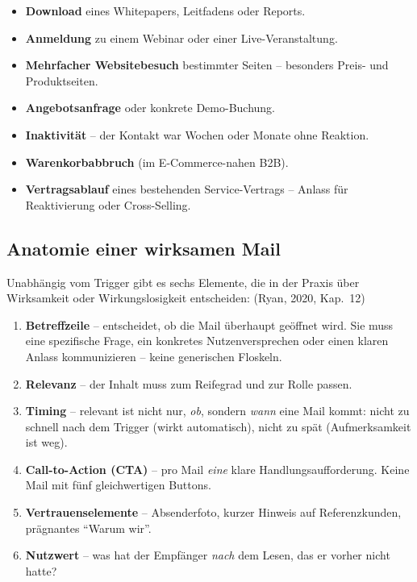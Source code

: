 \documentclass[11pt,a4paper,oneside]{article}
\newcommand{\quelle}[1]{{\footnotesize\color{lpGray}(#1)}}
\begin{document}
\begin{itemize}
  \item \textbf{Download} eines Whitepapers, Leitfadens oder Reports.
  \item \textbf{Anmeldung} zu einem Webinar oder einer Live-Veranstaltung.
  \item \textbf{Mehrfacher Websitebesuch} bestimmter Seiten -- besonders Preis- und Produktseiten.
  \item \textbf{Angebotsanfrage} oder konkrete Demo-Buchung.
  \item \textbf{Inaktivität} -- der Kontakt war Wochen oder Monate ohne Reaktion.
  \item \textbf{Warenkorbabbruch} (im E-Commerce-nahen B2B).
  \item \textbf{Vertragsablauf} eines bestehenden Service-Vertrags -- Anlass für Reaktivierung oder Cross-Selling.
\end{itemize}

\subsection{Anatomie einer wirksamen Mail}

Unabhängig vom Trigger gibt es sechs Elemente, die in der Praxis über Wirksamkeit oder Wirkungslosigkeit entscheiden: \quelle{Ryan, 2020, Kap.~12}

\begin{enumerate}
  \item \textbf{Betreffzeile} -- entscheidet, ob die Mail überhaupt geöffnet wird. Sie muss eine spezifische Frage, ein konkretes Nutzenversprechen oder einen klaren Anlass kommunizieren -- keine generischen Floskeln.
  \item \textbf{Relevanz} -- der Inhalt muss zum Reifegrad und zur Rolle passen.
  \item \textbf{Timing} -- relevant ist nicht nur, \emph{ob}, sondern \emph{wann} eine Mail kommt: nicht zu schnell nach dem Trigger (wirkt automatisch), nicht zu spät (Aufmerksamkeit ist weg).
  \item \textbf{Call-to-Action (CTA)} -- pro Mail \emph{eine} klare Handlungsaufforderung. Keine Mail mit fünf gleichwertigen Buttons.
  \item \textbf{Vertrauenselemente} -- Absenderfoto, kurzer Hinweis auf Referenzkunden, prägnantes ``Warum wir''.
  \item \textbf{Nutzwert} -- was hat der Empfänger \emph{nach} dem Lesen, das er vorher nicht hatte?
\end{enumerate}
\end{document}
